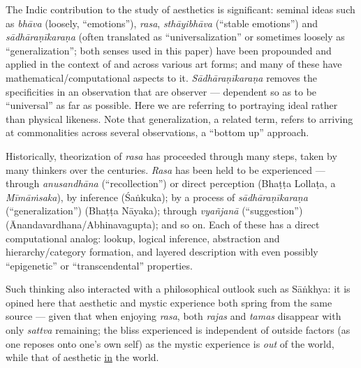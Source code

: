 The Indic contribution to the study of aesthetics is significant: seminal ideas such as \textsl{bhāva} (loosely, “emotions”), \textsl{rasa},
 \textsl{sthāyibhāva} (“stable emotions”) and \textsl{sādhāraṇīkaraṇa} (often translated as “universalization” or sometimes loosely as “generalization”; both senses used in this paper) have been propounded and applied in the context of and across various art forms; and many of these have mathematical/computational aspects to it. \textsl{Sādhāraṇīkaraṇa} removes the specificities in an observation that are observer --- dependent so as to be “universal” as far as possible. Here we are referring to portraying ideal rather than physical likeness. Note that generalization, a related term, refers to arriving at commonalities across several observations, a “bottom up” approach.

Historically, theorization of \textsl{rasa} has proceeded through many steps, taken by many thinkers over the centuries. \textsl{Rasa} has been held to be experienced --- through \textsl{anusandhāna} (“recollection”) or direct perception (Bhaṭṭa Lollaṭa, a \textsl{Mīmāṁsaka}), by inference (Śaṅkuka); by a process of \textsl{sādhāraṇīkaraṇa} (“generalization”) (Bhaṭṭa Nāyaka); through \textsl{vyañjanā} (“suggestion”) (Ānandavardhana/Abhinavagupta); and so on. Each of these has a direct computational analog: lookup, logical inference, abstraction and hierarchy/category formation, and layered description with even possibly “epigenetic” or “transcendental” properties.

Such thinking also interacted with a philosophical outlook such as Sāṅkhya: it is opined here that aesthetic and mystic experience both spring from the same source --- given that when enjoying \textsl{rasa}, both \textsl{rajas} and \textsl{tamas} disappear with only \textsl{sattva} remaining; the bliss experienced is independent of outside factors (as one reposes onto one’s own self) as the mystic experience is \textsl{out} of the world, while that of aesthetic \underline{in} the world.

